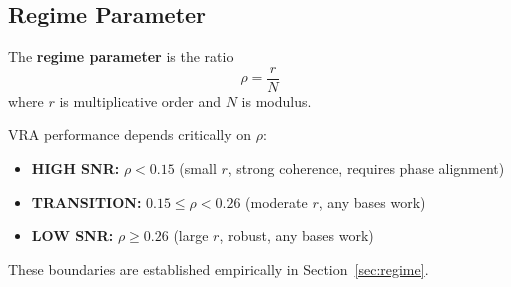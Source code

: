 \subsection{Regime Parameter}

\begin{definition}
The \textbf{regime parameter} is the ratio
\begin{equation}
\rho = \frac{r}{N}
\end{equation}
where $r$ is multiplicative order and $N$ is modulus.
\end{definition}

VRA performance depends critically on $\rho$:
\begin{itemize}
    \item \textbf{HIGH SNR:} $\rho < 0.15$ (small $r$, strong coherence, requires phase alignment)
    \item \textbf{TRANSITION:} $0.15 \leq \rho < 0.26$ (moderate $r$, any bases work)
    \item \textbf{LOW SNR:} $\rho \geq 0.26$ (large $r$, robust, any bases work)
\end{itemize}

These boundaries are established empirically in Section~\ref{sec:regime}.
